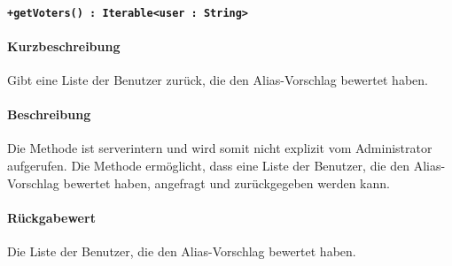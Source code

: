 \paragraph*{\texttt{+getVoters() : Iterable<user : String>}}%
\paragraph*{Kurzbeschreibung}
Gibt eine Liste der Benutzer zurück, die den Alias-Vorschlag bewertet haben.
\paragraph*{Beschreibung}
Die Methode ist serverintern und wird somit nicht explizit vom Administrator aufgerufen.
Die Methode ermöglicht, dass eine Liste der Benutzer, die den Alias-Vorschlag bewertet haben, angefragt und zurückgegeben werden kann.
\paragraph*{Rückgabewert}
Die Liste der Benutzer, die den Alias-Vorschlag bewertet haben.
